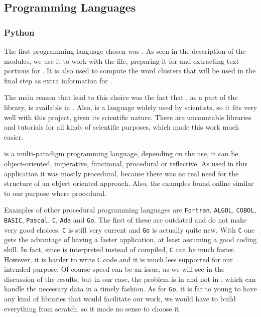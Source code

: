 \documentclass[12pt, openany]{book}
\begin{document}
\subsection{Programming Languages}

\subsubsection{Python}

The first programming language chosen was \python. As seen in the description of the modules, we use it to work with the \xml file, preparing it for \prolog and extracting text portions for \wordvec. It is also used to compute the word clusters that will be used in the final step as extra information for \alephilp. 

The main reason that lead to this choice was the fact that \wordvec, as a part of the \tensorflow library, is available in \python. Also, \python is a language widely used by scientists, so it fits very well with this project, given its scientific nature. There are uncountable \python libraries and tutorials for all kinds of scientific purposes, which made this work much easier. 

\python is a multi-paradigm programming language, depending on the use, it can be object-oriented, imperative, functional, procedural or reflective. As used in this application it was mostly procedural, because there was no real need for the structure of an object oriented approach. Also, the examples found online similar to our purpose where procedural.

Examples of other procedural programming languages are \texttt{Fortran}, \texttt{ALGOL}, \texttt{COBOL}, \texttt{BASIC}, \texttt{Pascal}, \texttt{C}, \texttt{Ada} and \texttt{Go}. The first of these are outdated and do not make very good choices. \texttt{C} is still very current and \texttt{Go} is actually quite new. With \texttt{C} one gets the advantage of having a faster application, at least assuming a good coding skill. In fact, since \python is interpreted instead of compiled, \texttt{C} can be much faster. However, it is harder to write \texttt{C} code and it is much less supported for our intended purpose. Of course speed can be an issue, as we will see in the discussion of the results, but in our case, the problem is in \alephilp and not in \python, which can handle the necessary data in a timely fashion. As for \texttt{Go}, it is far to young to have any kind of libraries that would facilitate our work, we would have to build everything from scratch, so it made no sense to choose it. 
\end{document}

